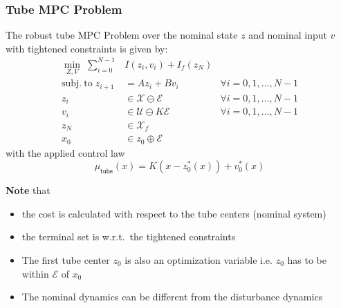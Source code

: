 \subsubsection{Tube MPC Problem}
The robust tube MPC Problem over the nominal state $z$ and nominal input $v$ with tightened constraints is given by:
\begin{align*}
    \min_{Z,V}\;         \sum_{i=0}^{N-1}                                                                & I(z_{i},v_{i})+I_{f}(z_{N})                                      \\
    \mathrm{subj.~to }\;                                                                         z_{i+1} & =Az_{i}+Bv_{i}                     & \forall i=0, 1, \ldots, N-1 \\
    z_{i}                                                                                                & \in\mathcal{X}\ominus\mathcal{E}   & \forall i=0, 1, \ldots, N-1 \\
    v_i                                                                                                  & \in\mathcal{U}\ominus K\mathcal{E} & \forall i=0, 1, \ldots, N-1 \\
    z_N                                                                                                  & \in \mathcal{X}_f                                                \\
    x_0                                                                                                  & \in z_0 \oplus \mathcal{E}
\end{align*}
with the applied control law
\begin{equation*}
    \mu_{\mathsf{tube}}(x) = K(x - z_0^*(x)) + v_0^*(x)
\end{equation*}

\textbf{Note} that
\begin{itemize}
    \item the cost is calculated with respect to the tube centers (nominal system)
    \item the terminal set is w.r.t.\ the tightened constraints
    \item The first tube center $z_0$ is also an optimization variable i.e. $z_0$ has to be within $\mathcal{E}$ of $x_0$
    \item The nominal dynamics can be different from the disturbance dynamics
\end{itemize}

\newpar{}

